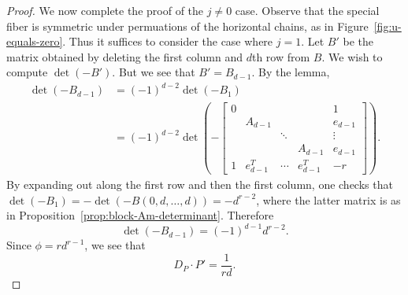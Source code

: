 \documentclass[reqno]{amsart}
\newtheorem{proposition}[thm]{Proposition}
\theoremstyle{definition}
\theoremstyle{remark}
\begin{document}
\begin{proof}
  We now complete the proof of the $j \neq 0$ case. Observe that the special fiber is symmetric under permuations of the horizontal chains, as in Figure~\ref{fig:u-equals-zero}. Thus it suffices to consider the case where $j = 1$. Let $B'$ be the matrix obtained by deleting the first column and $d$th row from $B$. We wish to compute $\det (-B')$. But we see that $B' = B_{d-1}$. By the lemma, 
  \begin{align*}
    \det (-B_{d-1}) &= (-1)^{d-2} \det (-B_1) \\
    &= (-1)^{d-2} \det \left(- \left[
      \begin{array}{cccccc}
        0 & & & & 1 \\
         & A_{d-1} & & & e_{d-1} \\
         & & \ddots & & \vdots \\
         & & & A_{d-1} & e_{d-1} \\
         1 & e_{d-1}^T & \cdots & e_{d-1}^T & -r
      \end{array}\right]\right).
  \end{align*}
  By expanding out along the first row and then the first column, one checks that $\det (-B_1) = -\det (-B(0,d, \dots, d)) = -d^{r-2}$, where the latter matrix is as in Proposition~\ref{prop:block-Am-determinant}. Therefore
  \[
  \det (-B_{d-1}) = (-1)^{d-1} d^{r-2}.
  \]
  Since $\phi = rd^{r-1}$, we see that 
  \[
  D_P \cdot P' = \frac{1}{rd}.
  \]
\end{proof}




   
\end{document}
